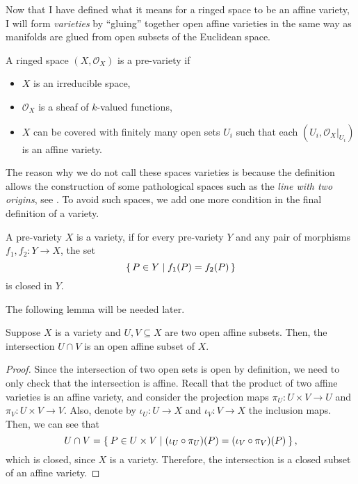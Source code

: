 Now that I have defined what it means for a ringed space to be an affine
variety, I will form \emph{varieties} by ``gluing'' together open affine varieties
in the same way as manifolds are glued from open subsets of the Euclidean
space.
\begin{defin}
  A ringed space $(X,\mathscr{O}_{X})$ is a pre-variety if
  \begin{itemize}
    \item $X$ is an irreducible space,
    \item $\mathscr{O}_{X}$ is a sheaf of $k$-valued functions,
    \item $X$ can be covered with finitely many open sets $U_{i}$
          such that each $(U_{i},\mathscr{O}_{X}\vert_{U_{i}})$ is
          an affine variety.
  \end{itemize}
\end{defin}
The reason why we do not call these spaces varieties
is because the definition allows the construction of some pathological
spaces such as the \emph{line with two origins}, see \cite{gathmann}.
To avoid such spaces, we add one more condition in the final definition
of a variety. %
\begin{defin}
  A pre-variety $X$ is a variety, if for every pre-variety $Y$ and any
  pair of morphisms $f_{1}, f_{2}: Y\to X$, the set
  \[\set{P\in Y\mid f_{1}(P)=f_{2}(P)}\]
  is closed in $Y$.
\end{defin}
The following lemma will be needed later.
\begin{lemm}\label{lemm:affine_intersection}
  Suppose $X$ is a variety and $U, V\subseteq X$ are two open affine subsets.
  Then, the intersection $U\cap V$ is an open affine subset of $X$.
\end{lemm}
\begin{proof}
  Since the intersection of two open sets is open by definition,
  we need to only check that the intersection is affine.
  Recall that the product of two affine varieties is an
  affine variety, and consider the projection maps $\pi_U:U\times V\to U$
  and $\pi_V:U\times V\to V$. Also, denote by $\iota_U:U\to X$
  and $\iota_V:V\to X$ the inclusion maps. Then, we can see that
  \[
    U\cap V=\Set{P\in U\times V\mid (\iota_U\circ\pi_U)(P)=(\iota_V\circ\pi_V)(P)},
  \]
  which is closed, since $X$ is a variety.
  Therefore, the intersection is a closed subset of an
  affine variety.
\end{proof}

